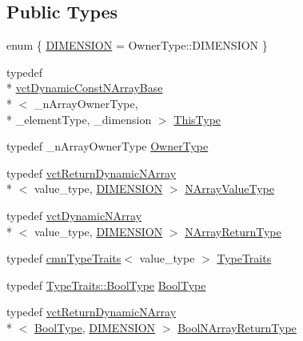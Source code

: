 \subsection*{Public Types}
\begin{DoxyCompactItemize}
\item 
enum \{ \hyperlink{classvct_dynamic_const_n_array_base_a815ac316ebc1bb2ab1969d307549826faf759c9ab831ff929b89af4ea2865a378}{D\-I\-M\-E\-N\-S\-I\-O\-N} = Owner\-Type\-:\-:D\-I\-M\-E\-N\-S\-I\-O\-N
 \}
\item 
typedef \\*
\hyperlink{classvct_dynamic_const_n_array_base}{vct\-Dynamic\-Const\-N\-Array\-Base}\\*
$<$ \-\_\-n\-Array\-Owner\-Type, \\*
\-\_\-element\-Type, \-\_\-dimension $>$ \hyperlink{classvct_dynamic_const_n_array_base_a5123caffcf1455a1b99003877eade897}{This\-Type}
\item 
typedef \-\_\-n\-Array\-Owner\-Type \hyperlink{classvct_dynamic_const_n_array_base_aad4328d01dc43be4b9047d594ed2ae8d}{Owner\-Type}
\item 
typedef \hyperlink{classvct_return_dynamic_n_array}{vct\-Return\-Dynamic\-N\-Array}\\*
$<$ value\-\_\-type, \hyperlink{classvct_dynamic_const_n_array_base_a815ac316ebc1bb2ab1969d307549826faf759c9ab831ff929b89af4ea2865a378}{D\-I\-M\-E\-N\-S\-I\-O\-N} $>$ \hyperlink{classvct_dynamic_const_n_array_base_a40632d0d6ab17d8fc3ea2097f889bffa}{N\-Array\-Value\-Type}
\item 
typedef \hyperlink{classvct_dynamic_n_array}{vct\-Dynamic\-N\-Array}\\*
$<$ value\-\_\-type, \hyperlink{classvct_dynamic_const_n_array_base_a815ac316ebc1bb2ab1969d307549826faf759c9ab831ff929b89af4ea2865a378}{D\-I\-M\-E\-N\-S\-I\-O\-N} $>$ \hyperlink{classvct_dynamic_const_n_array_base_a7507402a90022d7a14ad7038fac07041}{N\-Array\-Return\-Type}
\item 
typedef \hyperlink{classcmn_type_traits}{cmn\-Type\-Traits}$<$ value\-\_\-type $>$ \hyperlink{classvct_dynamic_const_n_array_base_ab1fc145860fe50454edfcfbe8347ccc1}{Type\-Traits}
\item 
typedef \hyperlink{classcmn_type_traits_aaa41087228a7f165bcd9f4385e644e28}{Type\-Traits\-::\-Bool\-Type} \hyperlink{classvct_dynamic_const_n_array_base_a16bf688936f61d1298ced8f637cfc1f8}{Bool\-Type}
\item 
typedef \hyperlink{classvct_return_dynamic_n_array}{vct\-Return\-Dynamic\-N\-Array}\\*
$<$ \hyperlink{classvct_dynamic_const_n_array_base_a16bf688936f61d1298ced8f637cfc1f8}{Bool\-Type}, \hyperlink{classvct_dynamic_const_n_array_base_a815ac316ebc1bb2ab1969d307549826faf759c9ab831ff929b89af4ea2865a378}{D\-I\-M\-E\-N\-S\-I\-O\-N} $>$ \hyperlink{classvct_dynamic_const_n_array_base_a983f2b7edd51a896d447383b5a5af289}{Bool\-N\-Array\-Return\-Type}
\end{DoxyCompactItemize}
